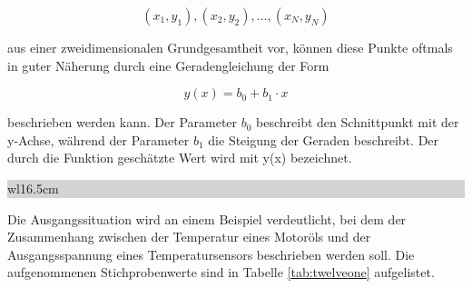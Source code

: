 \begin{equation}\label{eq:twelveone}
(x_{1} ,y_{1}),(x_{2} ,y_{2} ), ...,(x_{N} ,y_{N})
\end{equation}

\noindent aus einer zweidimensionalen Grundgesamtheit vor, k\"{o}nnen diese Punkte oftmals in guter N\"{a}herung durch eine Geradengleichung der Form

\begin{equation}\label{eq:twelvetwo}
y(x)=b_{0} +b_{1} \cdot x
\end{equation}

\noindent beschrieben werden kann. Der Parameter $b_{0}$ beschreibt den Schnittpunkt mit der y-Achse, w\"{a}hrend der Parameter $b_{1}$ die Steigung der Geraden beschreibt. Der durch die Funktion gesch\"{a}tzte Wert wird mit y(x) bezeichnet.

\clearpage

\noindent
\colorbox{lightgray}{%
%
\renewcommand\arraystretch{0.6}%
\begin{tabular}{ wl{16.5cm} }
{\selectfont
{}}
\end{tabular}%
}\bigskip

\noindent Die Ausgangssituation wird an einem Beispiel verdeutlicht, bei dem der Zusammenhang zwischen der Temperatur eines Motor\"{o}ls und der Ausgangsspannung eines Temperatursensors beschrieben werden soll. Die aufgenommenen Stichprobenwerte sind in Tabelle \ref{tab:twelveone} aufgelistet. 

